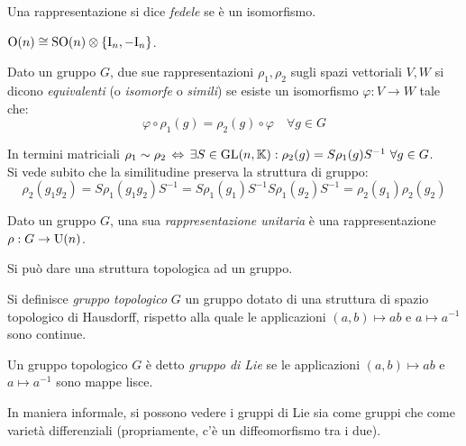 \begin{definition}
	Una rappresentazione si dice \textit{fedele} se è un isomorfismo.
\end{definition}

\begin{example}
	$ \mathrm{O}(n) \cong \mathrm{SO}(n) \otimes \{\mathrm{I}_n, -\mathrm{I}_n\} $.
\end{example}

\begin{definition}
	Dato un gruppo $ G $, due sue rappresentazioni $ \rho_1,\rho_2 $ sugli spazi vettoriali $ V,W $ si dicono \textit{equivalenti} (o \textit{isomorfe} o \textit{simili}) se esiste un isomorfismo $ \varphi : V \rightarrow W $ tale che:
	\begin{equation}
		\varphi \circ \rho_1(g) = \rho_2 (g) \circ \varphi \quad \forall g \in G
		\label{eq:8.1}
	\end{equation}
\end{definition}

In termini matriciali $ \rho_1 \sim \rho_2 \,\Leftrightarrow\, \exists S \in \mathrm{GL}(n,\mathbb{K}) : \rho_2(g) = S \rho_1(g) S^{-1} \,\,\forall g \in G $.\\
Si vede subito che la similitudine preserva la struttura di gruppo:
\begin{equation*}
	\rho_2(g_1 g_2) = S \rho_1(g_1 g_2) S^{-1} = S \rho_1(g_1) S^{-1} S \rho_1(g_2) S^{-1} = \rho_2(g_1) \rho_2(g_2)
\end{equation*}

\begin{definition}
	Dato un gruppo $ G $, una sua \textit{rappresentazione unitaria} è una rappresentazione $ \rho : G \rightarrow \mathrm{U}(n) $.
\end{definition}

Si può dare una struttura topologica ad un gruppo.

\begin{definition}
	Si definisce \textit{gruppo topologico} $ G $ un gruppo dotato di una struttura di spazio topologico di Hausdorff, rispetto alla quale le applicazioni $ (a,b) \mapsto ab $ e $ a \mapsto a^{-1} $ sono continue.
\end{definition}

\begin{definition}
	Un gruppo topologico $ G $ è detto \textit{gruppo di Lie} se le applicazioni $ (a,b) \mapsto ab $ e $ a \mapsto a^{-1} $ sono mappe lisce.
\end{definition}

In maniera informale, si possono vedere i gruppi di Lie sia come gruppi che come varietà differenziali (propriamente, c'è un diffeomorfismo tra i due).

